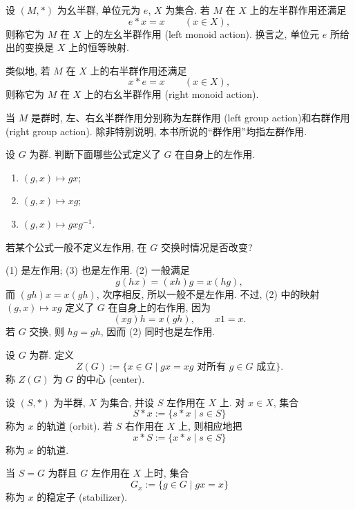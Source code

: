 \documentclass[usesamecnt, thmcnt=section, lang=cn, newtx, 10pt, scheme=chinese]{elegantbook}
\begin{document}
\begin{definition}[幺半群作用与群作用]\label{def:alg-group-action}
设 $(M,*)$ 为幺半群, 单位元为 $e$, $X$ 为集合. 若 $M$ 在 $X$ 上的左半群作用还满足
\[
 e*x=x\qquad(x\in X),
\]
则称它为 $M$ 在 $X$ 上的{\color{blue}左幺半群作用 (left monoid action)}. 换言之, 单位元 $e$ 所给出的变换是 $X$ 上的恒等映射.

类似地, 若 $M$ 在 $X$ 上的右半群作用还满足
\[
 x*e=x\qquad(x\in X),
\]
则称它为 $M$ 在 $X$ 上的{\color{blue}右幺半群作用 (right monoid action)}.

当 $M$ 是群时, 左、右幺半群作用分别称为{\color{blue}左群作用 (left group action)}和{\color{blue}右群作用 (right group action)}. 除非特别说明, 本书所说的``群作用''均指左群作用.
\end{definition}

\begin{concept}\label{con:alg-action-01}
设 $G$ 为群. 判断下面哪些公式定义了 $G$ 在自身上的左作用.
\begin{enumerate}[label=\rm(\arabic*)]
  \item $(g,x)\longmapsto gx$;
  \item $(g,x)\longmapsto xg$;
  \item $(g,x)\longmapsto gxg^{-1}$.
\end{enumerate}
若某个公式一般不定义左作用, 在 $G$ 交换时情况是否改变?
\end{concept}

\begin{solution}
(1) 是左作用; (3) 也是左作用. (2) 一般满足
\[
 g(h x)=(xh)g=x(hg),
\]
而 $(gh) x=x(gh)$, 次序相反, 所以一般不是左作用. 不过, (2) 中的映射 $(g,x)\mapsto xg$ 定义了 $G$ 在自身上的右作用, 因为
\[
 (xg)h=x(gh),
 \qquad
 x1=x.
\]
若 $G$ 交换, 则 $hg=gh$, 因而 (2) 同时也是左作用.
\end{solution}

\begin{definition}[群的中心]\label{def:alg-center}
设 $G$ 为群. 定义
\[
 Z(G):=\{x\in G\mid gx=xg\text{ 对所有 }g\in G\text{ 成立}\}.
\]
称 $Z(G)$ 为 $G$ 的{\color{blue}中心 (center)}.
\end{definition}

\begin{definition}[轨道与稳定子]\label{def:alg-orbit-stabilizer}
设 $(S,*)$ 为半群, $X$ 为集合, 并设 $S$ 左作用在 $X$ 上. 对 $x\in X$, 集合
\[
 S*x:=\{s*x\mid s\in S\}
\]
称为 $x$ 的{\color{blue}轨道 (orbit)}. 若 $S$ 右作用在 $X$ 上, 则相应地把
\[
 x*S:=\{x*s\mid s\in S\}
\]
称为 $x$ 的轨道.

当 $S=G$ 为群且 $G$ 左作用在 $X$ 上时, 集合
\[
 G_x:=\{g\in G\mid g x=x\}
\]
称为 $x$ 的{\color{blue}稳定子 (stabilizer)}.
\end{definition}
\end{document}
